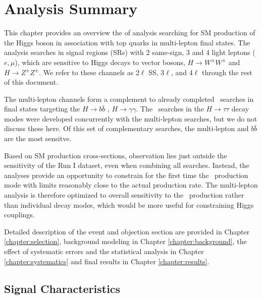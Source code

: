 \chapter[Analysis Summary][Analysis Summary]{Analysis Summary}
\label{chapter:analysis} 

This chapter provides an overview the of analysis searching for SM
production of the Higgs boson in association with top quarks in
multi-lepton final states. The analysis searches in signal regions (SRs)
with 2 same-sign, 3 and 4 light leptons ($e, \mu$), which are sensitive to Higgs
decays to vector bosons, $H\rightarrow W^{\pm}W^{\pm}$ and $H\rightarrow
Z^{\pm}Z^{\pm}$. We refer to these channels
as 2$\ell$ SS, 3$\ell$, and 4$\ell$ through the rest
of this document. 

The multi-lepton channels form a complement to already completed \tth\ searches in
final states targeting the $H\rightarrow b\bar{b}$ \cite{Aad:2014lma},
$H\rightarrow\gamma\gamma$\cite{ATLAS-CONF-2014-011}. The \tth\ searches
in the $H\rightarrow\tau\tau$ decay modes were developed concurrently with the
multi-lepton searches, but we do not discuss these here.  
Of this set of complementary searches, the multi-lepton and $b\bar{b}$ are the most sensitve. 

Based on SM production cross-sections, observation lies just outside the sensitivity
of the Run I dataset, even when combining all searches. Instead, the analyses provide an opportunity to 
constrain for the first time the \tth\ production mode with limits reasonably close to the
actual production rate. The multi-lepton analysis is therefore optimized to overall sensitivity to the 
\tth\ production rather than individual decay modes, which would be more useful for
constraining Higgs couplings. 

Detailed description of the event and objection section are provided in Chapter \ref{chapter:selection},
background modeling in Chapter \ref{chapter:background}, the effect of systematic errors and the 
statistical analysis in Chapter \ref{chapter:systematics} and final results in Chapter \ref{chapter:results}.


\section{Signal Characteristics} 

